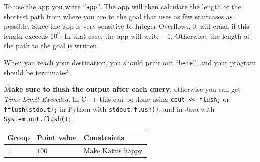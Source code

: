 To use the app you write ``\texttt{app}''.
The app will then calculate the length of the shortest path from where you are to the goal that uses as few staircases as possible.
Since the app is very sensitive to Integer Overflows, it will crash if this length exceeds $10^9$.
In that case, the app will write $-1$.
Otherwise, the length of the path to the goal is written.

When you reach your destination, you should print out ``\texttt{here}'', and your program should be terminated.


\textbf{Make sure to flush the output after each query}, otherwise you can get \textit{Time Limit Exceeded}.
In C++ this can be done using \texttt{cout << flush;}
or \texttt{fflush(stdout);}
in Python with \texttt{stdout.flush()},
and in Java with \texttt{System.out.flush();}.




\noindent
\begin{tabular}{| l | l | l |}
  \hline
  \textbf{Group} & \textbf{Point value} & \textbf{Constraints} \\ \hline
  $1$   & $100$        & Make Kattis happy. \\ \hline
\end{tabular}

